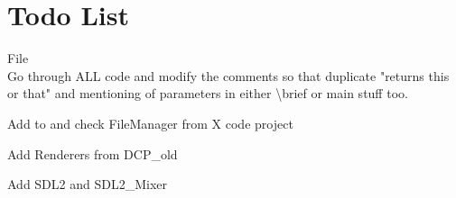 \chapter{Todo List}
\hypertarget{todo}{}\label{todo}

\begin{DoxyRefList}
\item[File \doxylink{_daves_code_library_8h}{Daves\+Code\+Library.h} ]\hfill \\
\label{todo__todo000004}%
%
Go through ALL code and modify the comments so that duplicate "{}returns this or that"{} and mentioning of parameters in either \textbackslash{}brief or main stuff too. 



Add to and check File\+Manager from X code project 



Add Renderers from DCP\+\_\+old 



Add SDL2 and SDL2\+\_\+\+Mixer 




\end{DoxyRefList}
